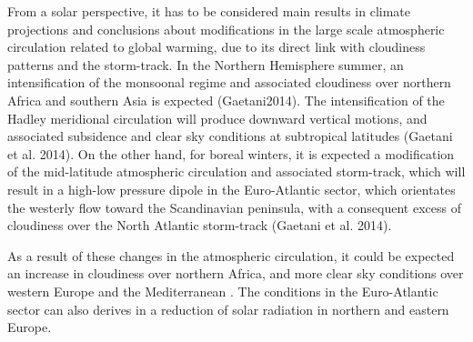 From a solar perspective, it has to be considered main results in climate projections and conclusions about modifications in the large scale atmospheric circulation related to global warming, due to its direct link with cloudiness patterns and the storm-track. In the Northern Hemisphere summer, an intensification of the monsoonal regime and associated cloudiness over northern Africa and southern Asia is expected (Gaetani2014). The intensification of the Hadley meridional circulation  will produce downward vertical motions, and associated subsidence and clear sky conditions at subtropical latitudes (Gaetani et al. 2014). On the other hand, for boreal winters, it is expected a modification of the mid-latitude atmospheric circulation and associated storm-track, which will result in a high-low pressure dipole in the Euro-Atlantic sector, which orientates the westerly flow toward the Scandinavian peninsula, with a consequent excess of cloudiness over the North Atlantic storm-track (Gaetani et al. 2014).

As a result of these changes in the atmospheric circulation, it could be expected an increase in cloudiness over northern Africa, and more clear sky conditions over western Europe and the Mediterranean \cite*{Gaetani2015}. The conditions in the Euro-Atlantic sector can also derives in a reduction of solar radiation in northern and eastern Europe.




